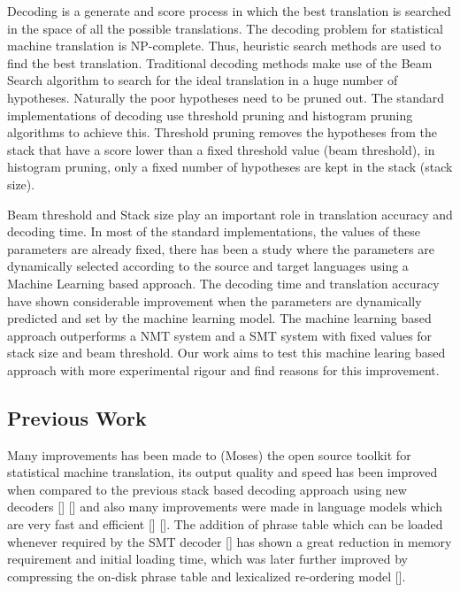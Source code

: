 \documentclass{article}
\begin{document}
Decoding is a generate and score process in which the best translation is searched in the space of all the possible translations. The decoding problem for statistical machine translation is NP-complete. Thus, heuristic search methods are used to find the best translation. Traditional decoding methods make use of the Beam Search algorithm to search for the ideal translation in a huge number of hypotheses. Naturally the poor hypotheses need to be pruned out. The standard implementations of decoding use threshold pruning and histogram pruning algorithms to achieve this. Threshold pruning removes the hypotheses from the stack that have a score lower than a fixed threshold value (beam threshold), in histogram pruning, only a fixed number of hypotheses are kept in the stack (stack size). 

Beam threshold and Stack size play an important role in translation accuracy and decoding time. In most of the standard implementations, the values of these parameters are already fixed, there has been a study where the parameters are dynamically selected according to the source and target languages using a Machine Learning based approach. The decoding time and translation accuracy have shown considerable improvement when the parameters are dynamically predicted and set by the machine learning model. The machine learning based approach outperforms a NMT system and a SMT system with fixed values for stack size and beam threshold. Our work aims to test this machine learing based approach with more experimental rigour and find reasons for this improvement.

\subsection{Previous Work}

Many improvements has been made to (Moses) the open source toolkit for statistical machine translation, its output quality and speed has been improved when compared to the previous stack based decoding approach using new decoders [] [] and also many improvements were made in language models which are very fast and efficient [] []. The addition of phrase table which can be loaded whenever required by the SMT decoder [] has shown a great reduction in memory requirement and initial loading time, which was later further improved by compressing the on-disk phrase table and lexicalized re-ordering model [].
\end{document}
